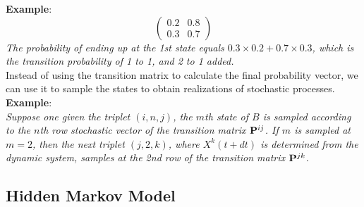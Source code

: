 \documentclass[12pt]{article}
\begin{document}
{\bf Example}: \\
{\emph{ 
\begin{equation}
  [0.3 0.7] \begin{pmatrix} 0.2 & 0.8 \\ 0.3 & 0.7 \end{pmatrix}
\end{equation}
The probability of ending up at the 1st state equals $0.3\times0.2 + 0.7\times0.3$, which is the transition probability of 1 to 1, and 2 to 1 added.
}}
\\

Instead of using the transition matrix to calculate the final probability vector, we can use it to sample the states to obtain realizations of stochastic processes. \\
{\bf Example}: \\
{\emph{
Suppose one given the triplet $(i,n,j)$, the $m$th state of $B$ is sampled according to the $n$th row stochastic vector of the transition matrix ${\bf P}^{ij}$. 
If $m$ is sampled at $m=2$, then the next triplet $(j,2,k)$, where $X^k(t+dt)$ is determined from the dynamic system, samples at the 2nd row of the transition matrix ${\bf P}^{jk}$.
}}

\subsection{Hidden Markov Model}
\end{document}
